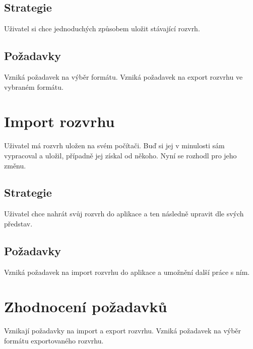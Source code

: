 \documentclass[a4paper, 11pt]{article}
\begin{document}
\subsection{Strategie}
Uživatel si chce jednoduchých způsobem uložit stávající rozvrh.

\subsection{Požadavky}
Vzniká požadavek na výběr formátu. Vzniká požadavek na export rozvrhu ve vybraném formátu.

\section{Import rozvrhu}
Uživatel má rozvrh uložen na svém počítači. Buď si jej v minulosti sám vypracoval a uložil, případně jej získal od někoho. Nyní se rozhodl pro jeho změnu.

\subsection{Strategie}
Uživatel chce nahrát svůj rozvrh do aplikace a ten následně upravit dle svých představ.

\subsection{Požadavky}
Vzniká požadavek na import rozvrhu do aplikace a umožnění další práce s ním.

\section{Zhodnocení požadavků}
Vznikají požadavky na import a export rozvrhu. Vzniká požadavek na výběr formátu exportovaného rozvrhu.
\end{document}
